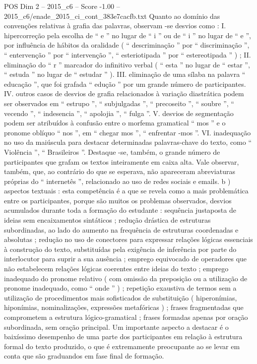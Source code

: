 \begin{textsample}{POS Dim 2 – 2015\_c6 – Score -1.00 – 2015\_c6/enade\_2015\_ci\_cont\_383e7cacfb.txt}
Quanto ao domínio das convenções relativas à grafia das palavras, observam -se desvios como : I. hipercorreção pela escolha de “ e ” no lugar de “ i ” ou de “ i ” no lugar de “ e ”, por influência de hábitos da oralidade ( “ descriminação ” por “ discriminação ”, “ entervenção ” por “ intervenção ”, “ esteriotipada ” por “ estereotipada ” ) ; II. eliminação do “ r ” marcador do infinitivo verbal ( “ esta ” no lugar de “ estar ”, “ estuda ” no lugar de “ estudar ” ).
III. eliminação de uma sílaba na palavra “ educação ”, que foi grafada “ edução ” por um grande número de participantes.
IV. outros casos de desvios de grafia relacionados à variação diastrática podem ser observados em “ estrupo ”, “ subjulgadas ”, “ precoseito ”, “ soubre ”, “ vecendo ”, “ indesencia ”, “ apolojia ”, “ fulga ”.
V. desvios de segmentação podem ser atribuídos à confusão entre o morfema gramatical “ mos ” e o pronome oblíquo “ nos ”, em “ chegar mos ”, “ enfrentar -mos ”.
VI. inadequação no uso da maiúscula para destacar determinadas palavras-chave do texto, como “ Violência ”, “ Brasileiros ”.
Destaque -se, também, o grande número de participantes que grafam os textos inteiramente em caixa alta.
Vale observar, também, que, ao contrário do que se esperava, não apareceram abreviaturas próprias do “ internetês ”, relacionado ao uso de redes sociais e emails. b ) aspectos textuais : esta competência é a que se revela como a mais problemática entre os participantes, porque são muitos os problemas observados, desvios acumulados durante toda a formação do estudante : sequência justaposta de ideias sem encaixamentos sintáticos ; redução drástica de estruturas subordinadas, ao lado do aumento na frequência de estruturas coordenadas e absolutas ; redução no uso de conectores para expressar relações lógicas essenciais à construção do texto, substituídas pela exigência de inferência por parte do interlocutor para suprir a sua ausência ; emprego equivocado de operadores que não estabelecem relações lógicas coerentes entre ideias do texto ; emprego inadequado do pronome relativo ( com omissão da preposição ou a utilização de pronome inadequado, como “ onde ” ) ; repetição exaustiva de termos sem a utilização de procedimentos mais sofisticados de substituição ( hiperonímias, hiponímias, nominalizações, expressões metafóricas ) ; frases fragmentadas que comprometem a estrutura lógico-gramatical ; frases formadas apenas por oração subordinada, sem oração principal.
Um importante aspecto a destacar é o baixíssimo desempenho de uma parte dos participantes em relação à estrutura formal do texto produzido, o que é extremamente preocupante ao se levar em conta que são graduandos em fase final de formação.

\end{textsample}
